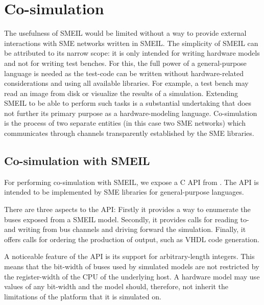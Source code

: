 \chapter{Co-simulation}
\label{sec:cosim}

The usefulness of SMEIL would be limited without a way to provide external
interactions with SME networks written in SMEIL. The simplicity of SMEIL can be
attributed to its narrow scope: it is only intended for writing hardware models
and not for writing test benches. For this, the full power of a general-purpose
language is needed as the test-code can be written without hardware-related
considerations and using all available libraries. For example, a test bench may
read an image from disk or visualize the results of a simulation. Extending
SMEIL to be able to perform such tasks is a substantial undertaking that does
not further its primary purpose as a hardware-modeling
language. Co-simulation~\cite{schloegl2015towards} is the process of two
separate entities (in this case two SME networks) which communicates through
channels transparently established by the SME libraries.

\section{Co-simulation with SMEIL}
For performing co-simulation with SMEIL, we expose a C API from \libsme{}. The
API is intended to be implemented by SME libraries for general-purpose
languages.

There are three aspects to the API: Firstly it provides a way to enumerate the
buses exposed from a SMEIL model. Secondly, it provides calls for reading to-
and writing from bus channels and driving forward the simulation. Finally, it
offers calls for ordering the production of output, such as VHDL code
generation.

A noticeable feature of the API is its support for arbitrary-length
integers. This means that the bit-width of buses used by simulated models are
not restricted by the register-width of the CPU of the underlying host. A
hardware model may use values of any bit-width and the model should, therefore,
not inherit the limitations of the platform that it is simulated on.


